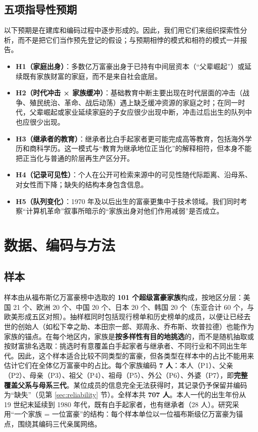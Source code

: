 \documentclass[UTF8,a4paper,11pt]{ctexart}
\begin{document}
\subsection{五项指导性预期}

以下预期是在建库和编码过程中逐步形成的。因此，我们用它们来组织探索性分析，而不是把它们当作预先登记的假设；与预期相悖的模式和相符的模式一并报告。

\begin{itemize}
\item \textbf{H1（家庭出身）}：多数亿万富豪出身于已持有中间层资本（“父辈崛起”）或延续既有家族财富的家庭，而不是来自社会底层。
\item \textbf{H2（时代冲击 × 家族缓冲）}：基础教育中断主要出现在时代层面的冲击（战争、殖民统治、革命、战后动荡）遇上缺乏缓冲资源的家庭之时；在同一时代，父辈崛起或家业延续家庭的子女应很少出现中断，冲击过后出生的队列中也应很少出现。
\item \textbf{H3（继承者的教育）}：继承者比白手起家者更可能完成高等教育，包括海外学历和商科学历。这一模式与“教育为继承地位正当化”的解释相符，但本身不能把正当化与普通的阶层再生产区分开。
\item \textbf{H4（记录可见性）}：个人在公开可检索来源中的可见性随代际距离、沿母系、对女性而下降；缺失的结构本身包含信息。
\item \textbf{H5（队列变化）}：1970 年及以后出生的富豪更集中于技术领域。我们同时考察“计算机革命”叙事所暗示的“家族出身对他们作用减弱”是否成立。
\end{itemize}

\section{数据、编码与方法}
\label{sec:data}

\subsection{样本}

样本由从福布斯亿万富豪榜中选取的 \textbf{101 个超级富豪家族}构成，按地区分层：美国 21 个、欧洲 20 个、中国 20 个、日本 20 个、韩国 20 个（东亚合计 60 个，与欧美形成五区对照）。抽样框同时包括现行榜单和历史榜单的成员，以便让已经去世的创始人（如松下幸之助、本田宗一郎、郑周永、乔布斯、坎普拉德）也能作为家族的锚点。在每个地区内，家族是\textbf{按多样性有目的地挑选}的，而不是随机抽取或按财富排名选取：挑选时有意覆盖白手起家者与继承者、不同行业和不同出生年代。因此，这个样本适合比较不同类型的富豪，但各类型在样本中的占比不能用来估计它们在全体亿万富豪中的占比。每个家族编码 \textbf{7 人}：本人（P1）、父亲（P2）、母亲（P3）、祖父（P4）、祖母（P5）、外公（P6）、外婆（P7），即\textbf{完整覆盖父系与母系三代}。某位成员的信息完全无法获得时，其记录仍予保留并编码为“缺失”（见第 \ref{sec:reliability} 节）。全样本共 \textbf{707 人}。本人一代的出生年份从 19 世纪末延续到 1980 年代，既有白手起家者，也有继承者（28 人）。研究采用“一个家族 = 一位富豪”的结构：每个样本单位以一位福布斯级亿万富豪为锚点，围绕其编码三代亲属网络。
\end{document}
